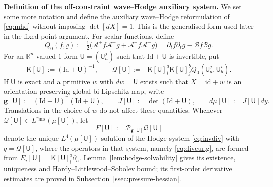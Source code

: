 \documentclass[11pt,reqno]{amsart}
\theoremstyle{plain}
\theoremstyle{definition}
\theoremstyle{remark}
\numberwithin{equation}{section}
\newcommand{\Ufield}{\mathsf U}
\newcommand{\Kmat}{\mathsf K}
\newcommand{\gmetric}{\mathbf g}
\newcommand{\Real}{\mathbb R}
\newcommand{\Rn}{\Real^n}
\begin{document}
\textbf{Definition of the off-constraint wave--Hodge auxiliary system.} We set some more notation and define the auxiliary wave--Hodge reformulation of \eqref{eq:mhd} without imposing $\det[d X]=1$.  This is the generalised form used later in the fixed-point argument. For scalar functions, define
\begin{equation}\label{eq:Q0}
 Q_0(f,g)
 :=\tfrac12\big(\mathcal A^+f \mathcal A^-g
                 +\mathcal A^-f \mathcal A^+g\big)
 =\partial_tf \partial_tg-\mathcal Bf \mathcal Bg.
\end{equation}
For an $\Rn$-valued $1$-form $\Ufield=(\Ufield_a^j)$ such that
$\mathrm{Id}+\Ufield$ is invertible, put
\begin{equation}\label{eq:datum}
 \Kmat[\Ufield]:=(\mathrm{Id}+\Ufield)^{-1},
 \qquad
 \mathcal Q[\Ufield]
 :=-\Kmat[\Ufield]^a_i\Kmat[\Ufield]^b_j
 Q_0(\Ufield_a^j,\Ufield_b^i).
\end{equation}
If $\Ufield$ is exact and a primitive $w$ with $dw=\Ufield$ exists such that $X=\mathrm{id}+w$ is an
orientation-preserving global bi-Lipschitz map, write
\begin{equation*}
 \gmetric[\Ufield]:= (\mathrm{Id}+\Ufield)^\top(\mathrm{Id}+\Ufield), \qquad
 J[\Ufield]:=\det(\mathrm{Id}+\Ufield), \qquad d\mu[\Ufield]:=J[\Ufield] dy.
\end{equation*}
Translations in the choice of $w$ do not affect these quantities.  Whenever
$\mathcal Q[\Ufield]\in L^{r_{\mathrm{HLS}}}(\mu[\Ufield])$, let
\begin{equation}\label{eq:FU}
    F[\Ufield]
 :=\mathcal P_{\gmetric[\Ufield]}\mathcal Q[\Ufield]
\end{equation}
denote the unique $L^4(\mu[\Ufield])$ solution of the Hodge system
\eqref{eq:invdiv} with $q=\mathcal Q[\Ufield]$, where the operators in that
system, namely \eqref{eq:divcurlg}, are formed from
$E_i[\Ufield]=\Kmat[\Ufield]^a_i\partial_a$.  Lemma~\ref{lem:hodge-solvability}
gives its existence, uniqueness and Hardy--Littlewood--Sobolev bound; its
first-order derivative estimates are proved in Subsection~\ref{ssec:pressure-hessian}.
\end{document}
